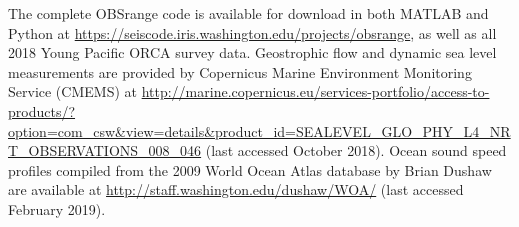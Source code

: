 The complete OBSrange code is available for download in both MATLAB and Python at \href{https://seiscode.iris.washington.edu/projects/obsrange}{https://seiscode.iris.washington.edu/projects/obsrange}, as well as all 2018 Young Pacific ORCA survey data. Geostrophic flow and dynamic sea level measurements are provided by Copernicus
Marine Environment Monitoring Service (CMEMS) at \href{http://marine.copernicus.eu/services-portfolio/access-to-products/?option=com_csw\&view=details\&product_id=SEALEVEL_GLO_PHY_L4_NRT_OBSERVATIONS_008_046}{http://marine.copernicus.eu/services-portfolio/access-to-products/?option=com\_csw\&view=details\&product\_id=SEALEVEL\_GLO\_PHY\_L4\_NRT\_OBSERVATIONS\_008\_046} (last accessed October 2018). Ocean sound speed profiles compiled from the 2009 World Ocean Atlas database by Brian Dushaw are available at \href{http://staff.washington.edu/dushaw/WOA/}{http://staff.washington.edu/dushaw/WOA/} (last accessed February 2019).